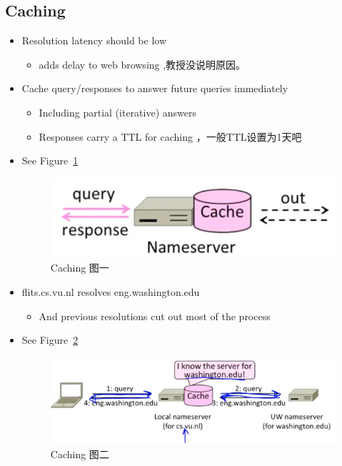 \documentclass[12pt]{ctexart}   %
\begin{document}
	\subsection{Caching}
	\begin{itemize}
		\item Resolution latency should be low
		\begin{itemize}
			\item adds delay to web browsing ,教授没说明原因。
		\end{itemize}
		
		\item Cache query/responses to answer future queries immediately
		\begin{itemize}
			\item Including partial (iterative) answers
			\item Responses carry a TTL for caching ，一般TTL设置为1天吧
		\end{itemize}
		\item See Figure~\ref{fig:8-3-3}
		  
		 \begin{figure}[h!] %
		\centering
		 \includegraphics[scale=0.7]{images/8-3-3}
		\caption{ Caching  图一}
		 \label{fig:8-3-3}
		 \end{figure}
		 
		 \item flits.cs.vu.nl resolves eng.washington.edu
		 \begin{itemize}
		 	\item And previous resolutions cut out most of the process
		 \end{itemize}
		 \item See Figure~\ref{fig:8-3-4}
		  
		 \begin{figure}[h!] %
		\centering
		 \includegraphics[scale=0.7]{images/8-3-4}
		\caption{ Caching  图二}
		 \label{fig:8-3-4}
		 \end{figure}
		 
	\end{itemize}
	
\end{document}
